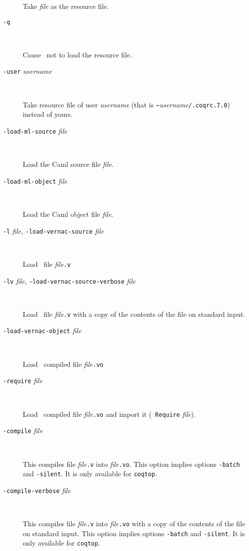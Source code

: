 \begin{description}
  Take {\em file} as the resource file.

\item[{\tt -q}]\ 

  Cause \Coq~not to load the resource file.

\item[{\tt -user} {\em username}]\ 

  Take resource file of user {\em username} (that is 
  \verb+~+{\em username}{\tt /.coqrc.7.0}) instead of yours.

\item[{\tt -load-ml-source} {\em file}]\ 

  Load the Caml source file {\em file}.

\item[{\tt -load-ml-object} {\em file}]\ 

  Load the Caml object file {\em file}.

\item[{\tt -l} {\em file}, {\tt -load-vernac-source} {\em file}]\ 

  Load \Coq~file {\em file}{\tt .v}

\item[{\tt -lv} {\em file}, {\tt -load-vernac-source-verbose} {\em file}]\ 

  Load \Coq~file {\em file}{\tt .v} with 
  a copy of the contents of the file on standard input.

\item[{\tt -load-vernac-object} {\em file}]\ 

  Load \Coq~compiled file {\em file}{\tt .vo}

%
\item[{\tt -require} {\em file}]\ 

  Load \Coq~compiled file {\em file}{\tt .vo} and import it ({\tt
    Require} {\em file}).

\item[{\tt -compile} {\em file}]\ 

  This compiles file {\em file}{\tt .v} into {\em file}{\tt .vo}.
  This option implies options {\tt -batch} and {\tt -silent}. It is
  only available for {\tt coqtop}.

\item[{\tt -compile-verbose} {\em file}]\ 

  This compiles file {\em file}{\tt .v} into {\em file}{\tt .vo} with
  a copy of the contents of the file on standard input.
  This option implies options {\tt -batch} and {\tt -silent}. It is
  only available for {\tt coqtop}.


\end{description}
